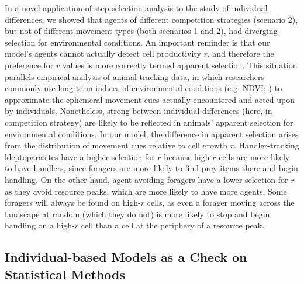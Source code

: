     In a novel application of step-selection analysis to the study of individual differences, we showed that agents of different competition strategies (scenario 2), but not of different movement types (both scenarios 1 and 2), had diverging selection for environmental conditions.
    An important reminder is that our model's agents cannot actually detect cell productivity $r$, and therefore the preference for $r$ values is more correctly termed apparent selection.
    This situation parallels empirical analysis of animal tracking data, in which researchers commonly use long-term indices of environmental conditions (e.g. NDVI; \citealt{pettorelli2011}) to approximate the ephemeral movement cues actually encountered and acted upon by individuals.
    Nonetheless, strong between-individual differences (here, in competition strategy) are likely to be reflected in animals' apparent selection for environmental conditions.
    In our model, the difference in apparent selection arises from the distribution of movement cues relative to cell growth $r$.
    Handler-tracking kleptoparasites have a higher selection for $r$ because high-$r$ cells are more likely to have handlers, since foragers are more likely to find prey-items there and begin handling.
    On the other hand, agent-avoiding foragers have a lower selection for $r$ as they avoid resource peaks, which are more likely to have more agents.
    Some foragers will always be found on high-$r$ cells, as even a forager moving across the landscape at random (which they do not) is more likely to stop and begin handling on a high-$r$ cell than a cell at the periphery of a resource peak.
    
    \subsection*{Individual-based Models as a Check on Statistical Methods}
    
